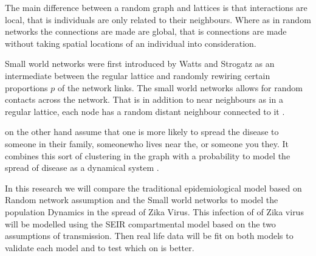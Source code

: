 The main difference between a random graph and lattices is that interactions are local, that is individuals are only related to their neighbours. Where as in random networks the connections are made are global, that is connections are made without taking spatial locations of an individual into consideration. 


Small world networks  were first introduced by Watts and Strogatz as an intermediate between the regular lattice and randomly rewiring certain proportions $p$ of the network links\citep{watts1998collective}. The small world networks allows for random contacts across the network. That is in addition to near neighbours as in a regular lattice, each node has a random distant neighbour connected to it \citep{watts1998collective}.

 
 on the other hand assume that one is more likely to spread the disease to someone in their family, someonewho lives near the, or someone you they. It combines this sort of clustering in the graph with a probability to model the spread of disease as a dynamical system \citep{newman2001random}.


In this research we will compare the traditional epidemiological model based on Random network assumption and the Small world networks to model the population Dynamics in the spread of Zika Virus. This infection of of Zika virus will be modelled using the SEIR compartmental model based on the two assumptions of transmission. Then real life data will be fit on both models to validate each model and to test which on is better.

